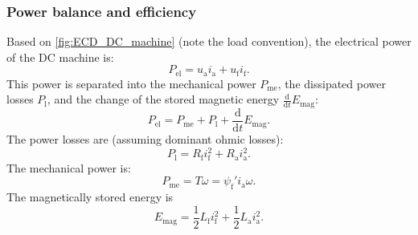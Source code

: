 \begin{frame}
	\frametitle{Power balance and efficiency}
		Based on \eqref{fig:ECD_DC_machine} (note the load convention), the electrical power of the DC machine is:
		\begin{equation}
			P_\mathrm{el} = u_\mathrm{a} i_\mathrm{a} + u_\mathrm{f} i_\mathrm{f}.
		\end{equation} \pause
		This power is separated into the mechanical power $P_\mathrm{me}$, the dissipated power losses $P_\mathrm{l}$, and the change of the stored magnetic energy $\frac{\mathrm{d}}{\mathrm{d}t}E_\mathrm{mag}$:
		\begin{equation}
			P_\mathrm{el} = P_\mathrm{me} + P_\mathrm{l} + \frac{\mathrm{d}}{\mathrm{d}t}E_\mathrm{mag}.
		\end{equation} \pause
		The power losses are (assuming dominant ohmic losses):
		\begin{equation}
			P_\mathrm{l} = R_\mathrm{f} i_\mathrm{f}^2 + R_\mathrm{a} i_\mathrm{a}^2.
		\end{equation} \pause
		The mechanical power is:
		\begin{equation}
			P_\mathrm{me} = T \omega = \psi_\mathrm{f}' i_\mathrm{a} \omega.
		\end{equation} \pause
		The magnetically stored energy is
		\begin{equation}
			E_\mathrm{mag} = \frac{1}{2} L_\mathrm{f} i_\mathrm{f}^2 + \frac{1}{2} L_\mathrm{a} i_\mathrm{a}^2.
		\end{equation}
\end{frame}

